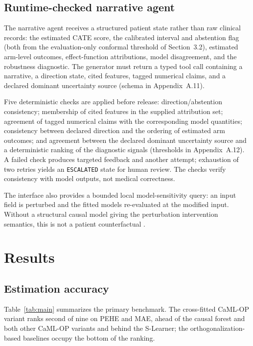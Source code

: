 \documentclass{article}
\begin{document}
\subsection{Runtime-checked narrative agent}
The narrative agent receives a structured patient state rather than raw clinical records: the estimated CATE score, the calibrated interval and abstention flag (both from the evaluation-only conformal threshold of Section~3.2), estimated arm-level outcomes, effect-function attributions, model disagreement, and the robustness diagnostic. The generator must return a typed tool call containing a narrative, a direction state, cited features, tagged numerical claims, and a declared dominant uncertainty source (schema in Appendix~A.11).

Five deterministic checks are applied before release: direction/abstention consistency; membership of cited features in the supplied attribution set; agreement of tagged numerical claims with the corresponding model quantities; consistency between declared direction and the ordering of estimated arm outcomes; and agreement between the declared dominant uncertainty source and a deterministic ranking of the diagnostic signals (thresholds in Appendix~A.12). A failed check produces targeted feedback and another attempt; exhaustion of two retries yields an \texttt{ESCALATED} state for human review. The checks verify consistency with model outputs, not medical correctness.

The interface also provides a bounded local model-sensitivity query: an input field is perturbed and the fitted models re-evaluated at the modified input. Without a structural causal model giving the perturbation intervention semantics, this is not a patient counterfactual \citep{pearl2009}.

\section{Results}
\subsection{Estimation accuracy}
Table~\ref{tab:main} summarizes the primary benchmark. The cross-fitted CaML-OP variant ranks second of nine on PEHE and MAE, ahead of the causal forest and both other CaML-OP variants and behind the S-Learner; the orthogonalization-based baselines occupy the bottom of the ranking.
\end{document}
